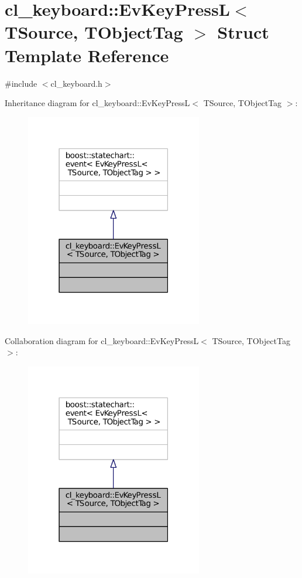 \hypertarget{structcl__keyboard_1_1EvKeyPressL}{}\section{cl\+\_\+keyboard\+:\+:Ev\+Key\+PressL$<$ T\+Source, T\+Object\+Tag $>$ Struct Template Reference}
\label{structcl__keyboard_1_1EvKeyPressL}


{\ttfamily \#include $<$cl\+\_\+keyboard.\+h$>$}



Inheritance diagram for cl\+\_\+keyboard\+:\+:Ev\+Key\+PressL$<$ T\+Source, T\+Object\+Tag $>$\+:
\nopagebreak
\begin{figure}[H]
\begin{center}
\leavevmode
\includegraphics[width=219pt]{structcl__keyboard_1_1EvKeyPressL__inherit__graph}
\end{center}
\end{figure}


Collaboration diagram for cl\+\_\+keyboard\+:\+:Ev\+Key\+PressL$<$ T\+Source, T\+Object\+Tag $>$\+:
\nopagebreak
\begin{figure}[H]
\begin{center}
\leavevmode
\includegraphics[width=219pt]{structcl__keyboard_1_1EvKeyPressL__coll__graph}
\end{center}
\end{figure}


